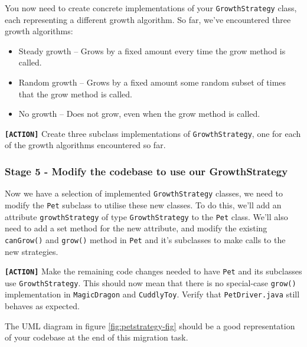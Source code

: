\documentclass[
]{book}
\providecommand{\tightlist}{%
  \setlength{\itemsep}{0pt}\setlength{\parskip}{0pt}}
\begin{document}
You now need to create concrete implementations of your \texttt{GrowthStrategy} class, each representing a different growth algorithm. So far, we've encountered three growth algorithms:

\begin{itemize}
\tightlist
\item
  Steady growth -- Grows by a fixed amount every time the grow method is called.
\item
  Random growth -- Grows by a fixed amount some random subset of times that the grow method is called.
\item
  No growth -- Does not grow, even when the grow method is called.
\end{itemize}

\textbf{\texttt{{[}ACTION{]}}} Create three subclass implementations of \texttt{GrowthStrategy}, one for each of the growth algorithms encountered so far.

\hypertarget{modifys}{%
\subsubsection{Stage 5 - Modify the codebase to use our GrowthStrategy}\label{modifys}}

Now we have a selection of implemented \texttt{GrowthStrategy} classes, we need to modify the \texttt{Pet} subclass to utilise these new classes. To do this, we'll add an attribute \texttt{growthStrategy} of type \texttt{GrowthStrategy} to the \texttt{Pet} class. We'll also need to add a set method for the new attribute, and modify the existing \texttt{canGrow()} and \texttt{grow()} method in \texttt{Pet} and it's subclasses to make calls to the new strategies.

\textbf{\texttt{{[}ACTION{]}}} Make the remaining code changes needed to have \texttt{Pet} and its subclasses use \texttt{GrowthStrategy}. This should now mean that there is no special-case \texttt{grow()} implementation in \texttt{MagicDragon} and \texttt{CuddlyToy}. Verify that \texttt{PetDriver.java} still behaves as expected.

The UML diagram in figure \ref{fig:petstrategy-fig} should be a good representation of your codebase at the end of this migration task.
\end{document}

